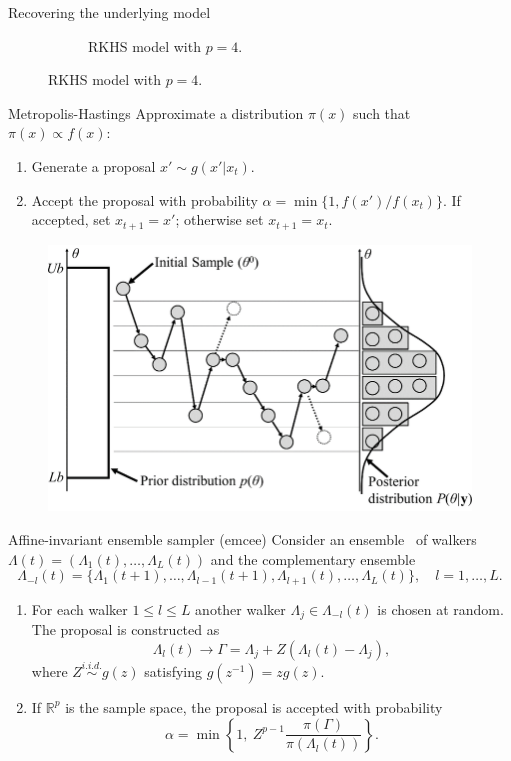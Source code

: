 \documentclass[9pt, english, professionalfonts]{beamer}
\newcommand\maroon[1]{\color{mLightBrown}#1\color{mDarkTeal}}
\newcommand{\R} {\ensuremath{\mathds{R}}}
\begin{document}
\begin{frame}{Recovering the underlying model}
\begin{figure}[b]
\begin{subfigure}[b]{0.48\textwidth}
    \caption{RKHS model with \(p=4\).}
  \end{subfigure}
\end{figure}
\end{frame}

\begin{frame}{Metropolis-Hastings}
  Approximate a distribution \(\pi(x)\) such that \(\pi(x)\propto f(x)\):
  \begin{enumerate}
  \item Generate a proposal \(x' \sim g(x'|x_t)\).
  \item Accept the proposal with probability \(\alpha=\min\{1, f(x')/f(x_t)\}\). If accepted, set \(x_{t+1}=x'\); otherwise set \(x_{t+1}=x_t\).
\end{enumerate}

\vspace{1em}

 \begin{figure}
   \centering
   \includegraphics[width=.6\textwidth]{mh}
 \end{figure}
\end{frame}

\begin{frame}{Affine-invariant ensemble sampler (emcee)}
Consider an \maroon{ensemble} \ of walkers \(\Lambda(t) = (\Lambda_1(t), \dots, \Lambda_L(t))\) and the complementary ensemble
\[
  \Lambda_{-l}(t) = \{\Lambda_1(t+1), \dots, \Lambda_{l-1}(t+1), \Lambda_{l+1}(t), \dots, \Lambda_L(t)\}, \quad l=1,\dots, L.
\]
\vspace{-1em}
\begin{enumerate}
  \item For each walker \(1\leq l \leq L\) another walker \(\Lambda_j \in \Lambda_{-l}(t)\) is chosen at random. The proposal is constructed as
  \[
    \Lambda_l(t) \to \Gamma = \Lambda_j + Z(\Lambda_l(t) - \Lambda_j),
\]
where \(Z \stackrel{i.i.d.}{\sim} g(z)\) satisfying \(g(z^{-1})=zg(z)\).

\item If \(\R^p\) is the sample space, the proposal is accepted with probability
  \[
    \alpha = \min\left\{1, \ Z^{p-1}\frac{\pi(\Gamma)}{\pi(\Lambda_l(t))}\right\}.
  \]
\end{enumerate}
\end{frame}
\end{document}

